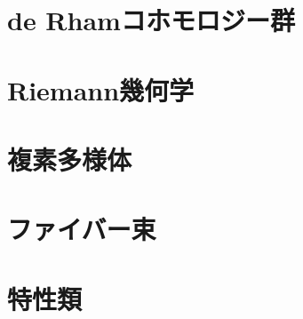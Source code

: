 \documentclass[a4paper]{jsreport}
\begin{document}
    \chapter{de Rhamコホモロジー群}
    \chapter{Riemann幾何学}
    \chapter{複素多様体}
    \chapter{ファイバー束}
    \chapter{特性類}
\end{document}
